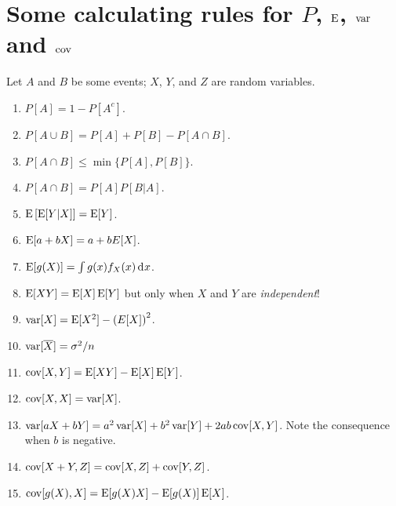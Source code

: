 \documentclass[twoside]{article}
\begin{document}
\section{Some calculating rules for $P$, $\operatorname{E}$, $\operatorname{var}$ and $\operatorname{cov}$}
Let $A$ and $B$ be some events; $X$, $Y$, and $Z$ are random variables.
\begin{enumerate}
\item $P[A] = 1 - P[A^c]$.
\item $P[A\cup B] = P[A] + P[B] - P[A\cap B]$.
\item $P[A\cap B] \leq \min\{P[A], P[B]\}$.
\item $P[A \cap B] = P[A] P[B|A]$.
\item $\operatorname{E}\left[\operatorname{E}[Y|X]\right] = \operatorname{E}[Y]$.
\item $\operatorname{E}[a + bX ] = a + bE[X]$.
\item $\E[g(X)] = \int g(x) f_X(x) \rd x$.
\item $\operatorname{E}[XY] = \operatorname{E}[X]\operatorname{E}[Y]$ but only when $X$ and $Y$ are \emph{independent}!
\item $\operatorname{var}[X] = \operatorname{E}[X^2] - \left(E[X]\right)^2$.
\item $\operatorname{var}[\overline{X}] = \sigma^2 / n$
\item $\operatorname{cov}[X,Y] = \operatorname{E}[XY] - \operatorname{E}[X]\operatorname{E}[Y]$.
\item $\operatorname{cov}[X,X] = \operatorname{var}[X]$.
\item $\operatorname{var}[a X + b Y] = a^2 \operatorname{var}[X] + b^2 \operatorname{var}[Y] + 2 a b \operatorname{cov}[X,Y]$. Note the consequence when $b$ is negative.
\item $\operatorname{cov}[X+Y,Z] =  \operatorname{cov}[X,Z] + \operatorname{cov}[Y,Z]$.
\item $\operatorname{cov}[g(X),X] = \operatorname{E}[g(X)X]  - \operatorname{E}[g(X)]\operatorname{E}[X]$.
\end{enumerate}
\end{document}
